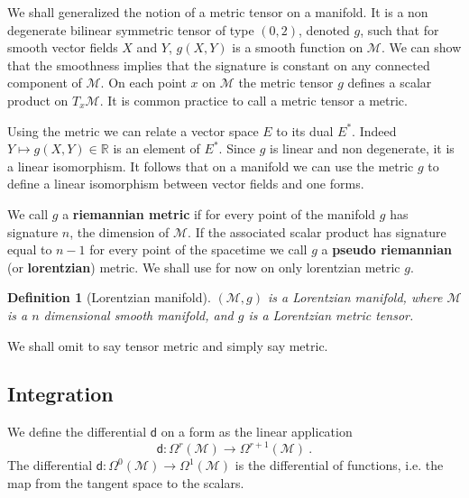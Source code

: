 \documentclass[11pt]{book}
\newcommand{\Mcal}{\mathcal{M}}
\newcommand{\Rbb}{\mathbb{R}}
\newcommand{\dsf}{\mathsf{d}}
\theoremstyle{break}
\newtheorem{definition}{Definition}[chapter]
\begin{document}
We shall generalized the notion of a metric tensor on a manifold. It is a non degenerate bilinear symmetric tensor of type $(0,2)$, denoted $g$, such that for smooth vector fields $X$ and $Y$, $g(X,Y)$ is a smooth function on $\Mcal$. We can show that the smoothness implies that the signature is constant on any connected component of $\Mcal$. On each point $x$ on $\Mcal$ the metric tensor $g$ defines a scalar product on $T_x\Mcal$. It is common practice to call a metric tensor a metric.


Using the metric we can relate a vector space $E$ to its dual $E^\ast$. Indeed $Y \mapsto g(X,Y) \in \Rbb$ is an element of $E^\ast$. Since $g$ is linear and non degenerate, it is a linear isomorphism. It follows that on a manifold we can use the metric $g$ to define a linear isomorphism between vector fields and one forms. 


We call $g$ a \textbf{riemannian metric} if for every point of the manifold $g$ has signature $n$, the dimension of $\Mcal$. If the associated scalar product has signature equal to $n-1$ for every point of the spacetime we call $g$ a \textbf{pseudo riemannian} (or \textbf{lorentzian}) metric. We shall use for now on only lorentzian metric $g$.

\begin{definition}[Lorentzian manifold]\label{def:lorentzian_M}
$(\Mcal,g)$ is a Lorentzian manifold, where $\Mcal$ is a $n$ dimensional smooth manifold, and $g$ is a Lorentzian metric tensor.
\end{definition}


We shall omit to say tensor metric and simply say metric.


\subsection{Integration}
\label{p:INTEGRATION}


We define the differential $\dsf$ on a form as the linear application
%
\begin{equation*}
\dsf : \Omega^r(\Mcal) \to \Omega^{r+1}(\Mcal) \ .
\end{equation*}
%
The differential $\dsf : \Omega^0(\Mcal) \to \Omega^1(\Mcal)$ is the differential of functions, i.e. the map from the tangent space to the scalars.
\end{document}
